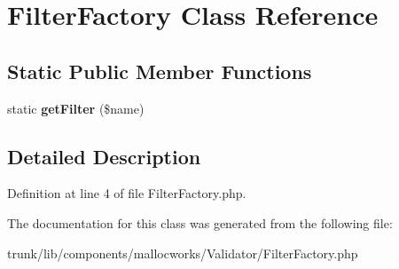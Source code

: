 \hypertarget{class_utopia_1_1_components_1_1_filter_1_1_filter_factory}{
\section{FilterFactory Class Reference}
\label{class_utopia_1_1_components_1_1_filter_1_1_filter_factory}
}
\subsection*{Static Public Member Functions}
\begin{DoxyCompactItemize}
\item 
\hypertarget{class_utopia_1_1_components_1_1_filter_1_1_filter_factory_af75f71a21d3ec89a425f2c896a4ee075}{
static {\bfseries getFilter} (\$name)}
\label{class_utopia_1_1_components_1_1_filter_1_1_filter_factory_af75f71a21d3ec89a425f2c896a4ee075}

\end{DoxyCompactItemize}


\subsection{Detailed Description}


Definition at line 4 of file FilterFactory.php.



The documentation for this class was generated from the following file:\begin{DoxyCompactItemize}
\item 
trunk/lib/components/mallocworks/Validator/FilterFactory.php\end{DoxyCompactItemize}
